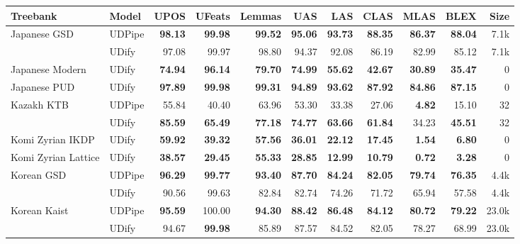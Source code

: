 \documentclass[11pt,a4paper]{article}
\begin{document}
\begin{table*}
    \fontsize{8}{10}\selectfont
    \begin{center}
    \begin{tabular}{@{}llrrrrrrrrr@{}}
    \toprule
    \sc Treebank & \sc Model & \sc UPOS & \sc UFeats & \sc Lemmas & \sc UAS & \sc LAS & \sc CLAS & \sc  MLAS & \sc BLEX & \sc Size \\
    \midrule
    Japanese GSD & UDPipe &  \bf 98.13 &  \bf 99.98 &   \bf 99.52 &  \bf 95.06 &  \bf 93.73 &  \bf 88.35 &  \bf 86.37 &  \bf 88.04 &   7.1k \\
               & UDify &      97.08 &      99.97 &       98.80 &      94.37 &      92.08 &      86.19 &      82.99 &      85.12 &   7.1k \\
    \addlinespace
    Japanese Modern & UDify &  \bf 74.94 &  \bf 96.14 &   \bf 79.70 &  \bf 74.99 &  \bf 55.62 &  \bf 42.67 &  \bf 30.89 &  \bf 35.47 &      0 \\
    \addlinespace
    Japanese PUD & UDify &  \bf 97.89 &  \bf 99.98 &   \bf 99.31 &  \bf 94.89 &  \bf 93.62 &  \bf 87.92 &  \bf 84.86 &  \bf 87.15 &      0 \\
    \addlinespace
    Kazakh KTB & UDPipe &      55.84 &      40.40 &       63.96 &      53.30 &      33.38 &      27.06 &   \bf 4.82 &      15.10 &     32 \\
               & UDify &  \bf 85.59 &  \bf 65.49 &   \bf 77.18 &  \bf 74.77 &  \bf 63.66 &  \bf 61.84 &      34.23 &  \bf 45.51 &     32 \\
    \addlinespace
    Komi Zyrian IKDP & UDify &  \bf 59.92 &  \bf 39.32 &   \bf 57.56 &  \bf 36.01 &  \bf 22.12 &  \bf 17.45 &   \bf 1.54 &   \bf 6.80 &      0 \\
    \addlinespace
    Komi Zyrian Lattice & UDify &  \bf 38.57 &  \bf 29.45 &   \bf 55.33 &  \bf 28.85 &  \bf 12.99 &  \bf 10.79 &   \bf 0.72 &   \bf 3.28 &      0 \\
    \addlinespace
    Korean GSD & UDPipe &  \bf 96.29 &  \bf 99.77 &   \bf 93.40 &  \bf 87.70 &  \bf 84.24 &  \bf 82.05 &  \bf 79.74 &  \bf 76.35 &   4.4k \\
               & UDify &      90.56 &      99.63 &       82.84 &      82.74 &      74.26 &      71.72 &      65.94 &      57.58 &   4.4k \\
    \addlinespace
    Korean Kaist & UDPipe &  \bf 95.59 &     100.00 &   \bf 94.30 &  \bf 88.42 &  \bf 86.48 &  \bf 84.12 &  \bf 80.72 &  \bf 79.22 &  23.0k \\
               & UDify &      94.67 &  \bf 99.98 &       85.89 &      87.57 &      84.52 &      82.05 &      78.27 &      68.99 &  23.0k \\

\end{tabular}
\end{center}
\end{table*}
\end{document}

